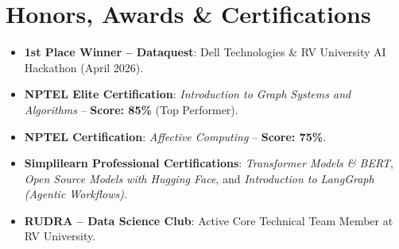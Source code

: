 \documentclass[10pt,a4paper]{article}
\begin{document}
\section{Honors, Awards \& Certifications}
\begin{itemize}
  \item \textbf{1st Place Winner -- Dataquest}: Dell Technologies \& RV University AI Hackathon (April 2026).
  \item \textbf{NPTEL Elite Certification}: \textit{Introduction to Graph Systems and Algorithms} -- \textbf{Score: 85\%} (Top Performer).
  \item \textbf{NPTEL Certification}: \textit{Affective Computing} -- \textbf{Score: 75\%}.
  \item \textbf{Simplilearn Professional Certifications}: \textit{Transformer Models \& BERT}, \textit{Open Source Models with Hugging Face}, and \textit{Introduction to LangGraph (Agentic Workflows)}.
  \item \textbf{RUDRA -- Data Science Club}: Active Core Technical Team Member at RV University.
\end{itemize}
\end{document}

